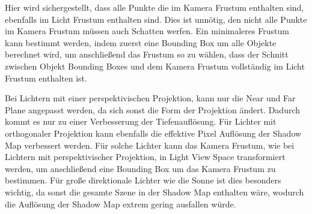 Hier wird sichergestellt, dass alle Punkte die im Kamera Frustum enthalten sind, ebenfalls im
Licht Frustum enthalten sind. Dies ist unnötig, den nicht alle Punkte im Kamera Frustum müssen auch Schatten werfen.
Ein minimaleres Frustum kann bestimmt werden, indem zuerst eine Bounding Box um alle Objekte berechnet wird,
um anschließend das Frustum so zu wählen, 
dass der Schnitt zwischen Objekt Bounding Boxes und dem Kamera Frustum vollständig im
Licht Frustum enthalten ist.
\par
Bei Lichtern mit einer perspektivischen Projektion, kann nur die Near und Far Plane angepasst werden, da sich sonst die Form der Projektion
ändert. 
Dadurch kommt es nur zu einer Verbesserung der Tiefenauflösung.
Für Lichter mit orthogonaler Projektion kann ebenfalls die effektive Pixel Auflösung der Shadow Map verbessert werden.
Für solche Lichter kann das Kamera Frustum, wie bei Lichtern mit perspektivischer Projektion, in Light View Space 
transformiert werden, um anschließend eine Bounding Box um das Kamera Frustum zu bestimmen. 
Für große direktionale Lichter wie die Sonne ist dies besonders wichtig, da sonst die gesamte Szene in der Shadow Map enthalten wäre,
wodurch die Auflösung der Shadow Map extrem gering ausfallen würde.

